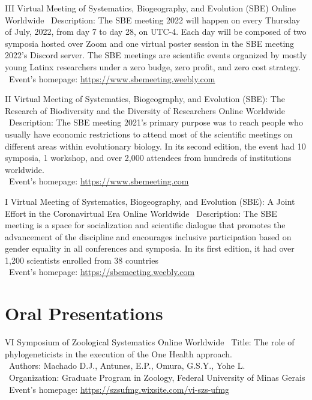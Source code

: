 \documentclass[11pt, letterpaper, sans]{moderncv}
\begin{document}
	{III Virtual Meeting of Systematics, Biogeography, and Evolution (SBE)}
	{Online}
	{Worldwide}
	{}
	{
		\textbullet~Description: The SBE meeting 2022 will happen on every Thursday of July, 2022, from day 7 to day 28, on UTC-4. Each day will be composed of two symposia hosted over Zoom and one virtual poster session in the SBE meeting 2022's Discord server. The SBE meetings are scientific events organized by mostly young Latinx researchers under a zero budge, zero profit, and zero cost strategy.\\
		\textbullet~Event's homepage: \url{https://www.sbemeeting.weebly.com}
	}

	{II Virtual Meeting of Systematics, Biogeography, and Evolution (SBE): The Research of Biodiversity and the Diversity of Researchers}
	{Online}
	{Worldwide}
	{}
	{
		\textbullet~Description: The SBE meeting 2021's primary purpose was to reach people who usually have economic restrictions to attend most of the scientific meetings on different areas within evolutionary biology. In its second edition, the event had 10 symposia, 1 workshop, and over 2,000 attendees from hundreds of institutions worldwide.\\
		\textbullet~Event's homepage: \url{https://www.sbemeeting.com}
	}

	{I Virtual Meeting of Systematics, Biogeography, and Evolution (SBE): A Joint Effort in the Coronavirtual Era}
	{Online}
	{Worldwide}
	{}
	{
		\textbullet~Description: The SBE meeting is a space for socialization and scientific dialogue that promotes the advancement of the discipline and encourages inclusive participation based on gender equality in all conferences and symposia. In its first edition, it had over 1,200 scientists enrolled from 38 countries\\
		\textbullet~Event's homepage: \url{https://sbemeeting.weebly.com}
	}


\section{Oral Presentations}

	{VI Symposium of Zoological Systematics}
	{Online}
	{Worldwide}
	{}
	{
		\textbullet~Title: The role of phylogeneticists in the execution of the One Health approach.\\
		\textbullet~Authors: Machado D.J., Antunes, E.P., Omura, G.S.Y., Yohe L.\\
		\textbullet~Organization: Graduate Program in Zoology, Federal University of Minas Gerais\\
		\textbullet~Event's homepage: \url{https://szsufmg.wixsite.com/vi-szs-ufmg}
	}
\end{document}
